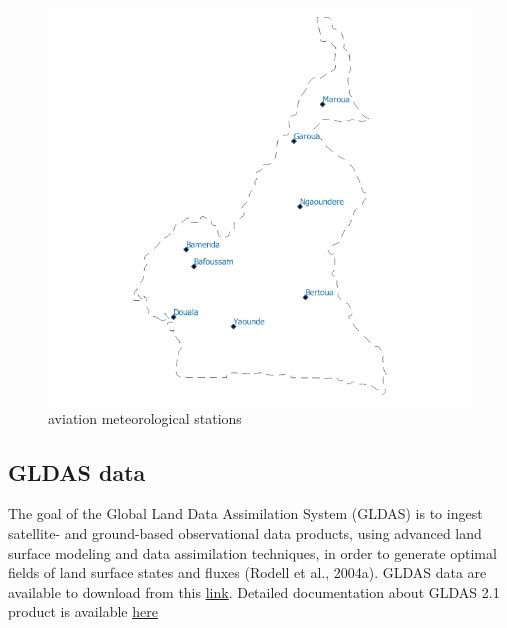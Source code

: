 \begin{figure}[H]
\begin{center}
\includegraphics[scale=0.8]{cmr_station.png} %
\end{center}
\caption{aviation meteorological stations}
\label{aviation meteorological stations}%
\end{figure}
\subsection{GLDAS data}
The goal of the Global Land Data Assimilation System (GLDAS) is to ingest satellite- and ground-based observational data products, using advanced land surface modeling and data assimilation techniques, in order to generate optimal fields of land surface states and fluxes (Rodell et al., 2004a).
GLDAS data are available to download from this \href{https://hydro1.gesdisc.eosdis.nasa.gov/data/GLDAS/GLDAS_NOAH025_3H.2.1/}{link}.
Detailed documentation about GLDAS 2.1 product is available \href{https://hydro1.gesdisc.eosdis.nasa.gov/data/GLDAS/GLDAS_NOAH025_3H.2.1/doc/README_GLDAS2.pdf.}{here}  

